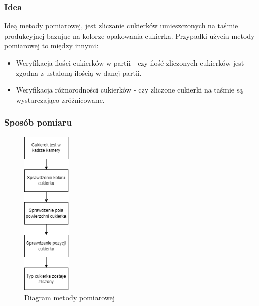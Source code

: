 \documentclass{article}
\begin{document}
\subsubsection{Idea}
\label{Idea}

Ideą metody pomiarowej, jest zliczanie cukierków umieszczonych na taśmie produkcyjnej bazując na kolorze opakowania cukierka. Przypadki użycia metody pomiarowej to między innymi:

\begin{itemize}
    \item Weryfikacja ilości cukierków w partii - czy ilość zliczonych cukierków jest zgodna z ustaloną ilością w danej partii.
    \item Weryfikacja różnorodności cukierków - czy zliczone cukierki na taśmie są wystarczająco zróżnicowane.
\end{itemize}

\subsubsection{Sposób pomiaru}
\label{Sposób pomiaru}

\begin{figure}[H]
    \centering
    \includegraphics[height=8cm]{diagramMetody.png}
    \caption{Diagram metody pomiarowej}
    \label{fig:diagramMetody}
\end{figure}
\end{document}
